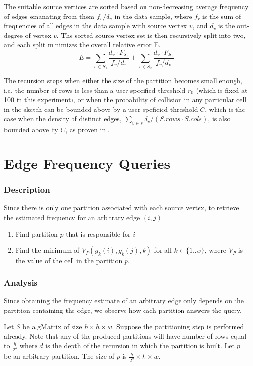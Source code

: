 The suitable source vertices are sorted based on non-decreasing average frequency of edges emanating from them $f_v/d_v$ in the data sample, where $f_v$ is the sum of frequencies of all edges in the data sample with source vertex $v$, and $d_v$ is the out-degree of vertex $v$. The sorted source vertex set is then recursively split into two, and each split minimizes the overall relative error E. \[E = \sum_{v \in S_1} \frac{d_v \cdot F_{S_1}}{f_v / d_v} + \sum_{v \in S_2} \frac{d_v \cdot F_{S_1}}{f_v / d_v}\]

The recursion stops when either the size of the partition becomes small enough, i.e. the number of rows is less than a user-specified threshold $r_0$ (which is fixed at 100 in this experiment), or when the probability of collision in any particular cell in the sketch can be bounded above by a user-speficied threshold $C$, which is the case when the density of distinct edges, $\sum_{v \in s} d_v/(S.rows \cdot S.cols)$, is also bounded above by $C$, as proven in \cite{DBLP}.


\section{Edge Frequency Queries}

\subsubsection{Description}
Since there is only one partition associated with each source vertex, to retrieve the estimated frequency for an arbitrary edge $(i,j)$:

\begin{enumerate}
  \item Find partition $p$ that is responsible for $i$
  \item Find the minimum of $V_P(g_k(i),g_k(j),k)$ for all $k \in \{1..w\}$, where $V_P$ is the value of the cell in the partition $p$. 
\end{enumerate}

\subsubsection{Analysis}

Since obtaining the frequency estimate of an arbitrary edge only depends on the partition containing the edge, we observe how each partition answers the query.

Let $S$ be a gMatrix of size $h\times h\times w$. Suppose the partitioning step is performed already. Note that any of the produced partitions will have number of rows equal to $\frac{h}{2^d}$ where $d$ is the depth of the recursion in which the partition is built. Let $p$ be an arbitrary partition. The size of $p$ is $\frac{h}{2^d}\times h\times w$.

